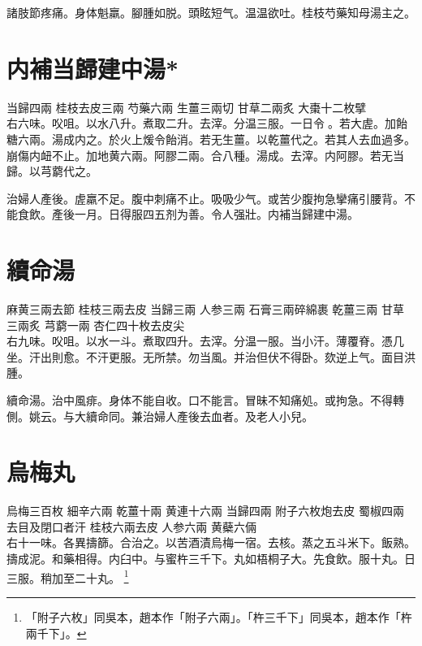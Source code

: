 諸肢節疼痛。身体魁羸。腳腫如脱。頭眩短气。温温欲吐。桂枝芍藥知母湯主之。

\section{内補当歸建中湯*}

当歸{\scriptsize 四兩} 桂枝{\scriptsize 去皮三兩} 芍藥{\scriptsize 六兩} 生薑{\scriptsize 三兩切} 甘草{\scriptsize 二兩炙} 大棗{\scriptsize 十二枚擘}\\
右六味。㕮咀。以水八升。煮取二升。去滓。分温三服。一日令{\sungii 𥁞}。若大虗。加飴糖六兩。湯成内之。於火上煖令飴消。若无生薑。以乾薑代之。若其人去血過多。崩傷内衄不止。加地黄六兩。阿膠二兩。合八種。湯成。去滓。内阿膠。若无当歸。以芎藭代之。

治婦人產後。虗羸不足。腹中刺痛不止。吸吸少气。或苦少腹拘急攣痛引腰背。不能食飲。產後一月。日得服四五剂为善。令人强壯。内補当歸建中湯。

\section{續命湯}

麻黄{\scriptsize 三兩去節} 桂枝{\scriptsize 三兩去皮} 当歸{\scriptsize 三兩} 人参{\scriptsize 三兩} 石膏{\scriptsize 三兩碎綿裹} 乾薑{\scriptsize 三兩} 甘草{\scriptsize 三兩炙} 芎藭{\scriptsize 一兩} 杏仁{\scriptsize 四十枚去皮尖}\\
右九味。㕮咀。以水一斗。煮取四升。去滓。分温一服。当小汗。薄覆脊。憑几坐。汗出則愈。不汗更服。无所禁。勿当風。并治但伏不得卧。欬逆上气。面目洪腫。

續命湯。治中風痱。身体不能自收。口不能言。冒昧不知痛処。或拘急。不得轉側。{\scriptsize 姚云。与大續命同。兼治婦人產後去血者。及老人小兒。}

\section{烏梅丸}

烏梅{\scriptsize 三百枚} 細辛{\scriptsize 六兩} 乾薑{\scriptsize 十兩} 黄連{\scriptsize 十六兩} 当歸{\scriptsize 四兩} 附子{\scriptsize 六枚炮去皮} 蜀椒{\scriptsize 四兩去目及閉口者汗} 桂枝{\scriptsize 六兩去皮} 人参{\scriptsize 六兩} 黄蘗{\scriptsize 六倆}\\
右十一味。{\khaai 各}異擣篩。合治之。以苦酒漬烏梅一宿。去核。蒸之五斗米下。飯熟。擣成泥。和藥相得。内臼中。与蜜杵三千下。丸如梧桐子大。先食飲。服十丸。日三服。稍加{\khaai 至}二十丸。
	\footnote{
		「附子六枚」同吳本，趙本作「附子六兩」。「杵三千下」同吳本，趙本作「杵兩千下」。
	}

